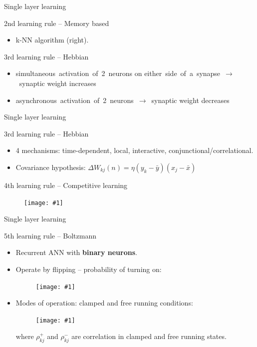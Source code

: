 \documentclass[9pt,t]{beamer}
\newcommand{\picEqHereWidth}[2] { %
    \begin{figure}[htp] 
        \centering
        \texttt{[image: \#1]}
    \end{figure}
}
\begin{document}
\begin{frame}{Single layer learning}
\begin{alertblock}{2nd learning rule -- Memory based}
\begin{itemize}
            \item k-NN algorithm (right).
        \end{itemize}
    \end{alertblock}
    \begin{alertblock}{3rd learning rule -- Hebbian}
        \begin{itemize}
            \item simultaneous~activation~of~2~neurons on either~side~of~a~synapse~$ \rightarrow $~synaptic weight increases
            \item asynchronous~activation~of~2~neurons~$ \rightarrow $~synaptic weight decreases
        \end{itemize}
    \end{alertblock}

\end{frame}

\begin{frame}{Single layer learning}
    \begin{alertblock}{3rd learning rule -- Hebbian}
        \begin{itemize}
            \item 4 mechanisms: time-dependent, local, interactive, conjunctional/correlational.
            \item Covariance hypothesis: $ \Delta W_{kj}(n) = \eta (y_k - \bar{y})(x_j - \bar{x}) $
        \end{itemize}
    \end{alertblock}
    \begin{alertblock}{4th learning rule -- Competitive learning}
        \picEqHereWidth{competitive_learning}{0.7\linewidth}
    \end{alertblock}
\end{frame}

\begin{frame}{Single layer learning}
    \begin{alertblock}{5th learning rule -- Boltzmann}
        \begin{itemize}
            \item Recurrent ANN with \textbf{binary neurons}.
            \item Operate by flipping -- probability of turning on:
            \picEqHereWidth{boltzmann_eq.png}{0.5\linewidth}
            \item Modes of operation: clamped and free running conditions:
            \picEqHereWidth{boltzmann_eq2.png}{0.4\linewidth}
            where $ \rho^+_{kj} $ and $ \rho^-_{kj} $ are correlation in clamped and free running states.
        \end{itemize}
    \end{alertblock}
\end{frame}
\end{document}
